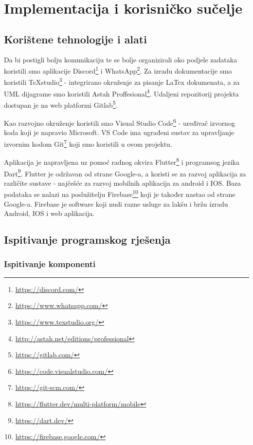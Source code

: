\chapter{Implementacija i korisničko sučelje}
		
		
		\section{Korištene tehnologije i alati}
		
			Da bi postigli bolju komunikaciju te se bolje organizirali oko podjele zadataka koristili smo aplikacije Discord\footnote{\url{https://discord.com/}} i WhatsApp\footnote{\url{https://www.whatsapp.com/}}. Za izradu dokumentacije smo koristili TeXstudio\footnote{\url{https://www.texstudio.org/}} - integrirano okruženje za pisanje LaTex dokumenata, a za UML dijagrame smo koristili Astah Proffesional\footnote{\url{http://astah.net/editions/professional}}. Udaljeni repozitorij projekta dostupan je na web platformi Gitlab\footnote{\url{https://gitlab.com/}}.
			
			Kao razvojno okruženje koristili smo Visual Studio Code\footnote{\url{https://code.visualstudio.com/}} - uređivač izvornog koda koji je napravio Microsoft. VS Code ima ugrađeni sustav za upravljanje izvornim kodom Git\footnote{\url{https://git-scm.com/}} koji smo koristili u ovom projektu.
			
			Aplikacija je napravljena uz pomoć radnog okvira Flutter\footnote{\url{https://flutter.dev/multi-platform/mobile}} i programsog jezika Dart\footnote{\url{https://dart.dev/}}. Flutter je održavan od strane Google-a, a koristi se za razvoj aplikacija za različite sustave - najčešće za razvoj mobilnih aplikacija za android i IOS. Baza podataka se nalazi na poslužitelju Firebase\footnote{\url{https://firebase.google.com/}} koji je također nastao od strane Google-a. Firebase je software koji nudi razne usluge za lakšu i bržu izradu Android, IOS i web aplikacija.
			
			\eject 
		
	
		\section{Ispitivanje programskog rješenja}
	
			
			\subsection{Ispitivanje komponenti}
			

